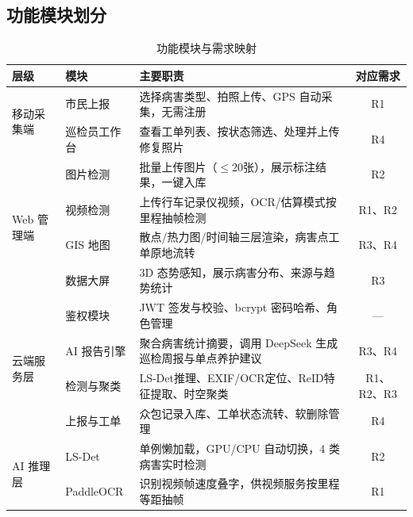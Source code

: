 \documentclass[UTF8, a4paper, fontset=ubuntu]{ctexart}
\begin{document}
  \subsection{功能模块划分}

  \begin{table}[H]
  \centering
  \caption{功能模块与需求映射}
  \label{tab:modules}
  \begin{tabular}{lllc}
  \toprule
  层级 & 模块 & 主要职责 & 对应需求 \\
  \midrule
  \multirow{2}{*}{移动采集端}
    & 市民上报     & 选择病害类型、拍照上传、GPS 自动采集，无需注册   & R1 \\
    & 巡检员工作台 & 查看工单列表、按状态筛选、处理并上传修复照片     & R4 \\
  \midrule
  \multirow{4}{*}{Web 管理端}
    & 图片检测 & 批量上传图片（$\leq$20张），展示标注结果，一键入库 & R2 \\
    & 视频检测 & 上传行车记录仪视频，OCR/估算模式按里程抽帧检测   & R1、R2 \\
    & GIS 地图 & 散点/热力图/时间轴三层渲染，病害点工单原地流转   & R3、R4 \\
    & 数据大屏 & 3D 态势感知，展示病害分布、来源与趋势统计        & R3 \\
  \midrule
  \multirow{4}{*}{云端服务层}
    & 鉴权模块   & JWT 签发与校验、bcrypt 密码哈希、角色管理            & --- \\
    & AI 报告引擎 & 聚合病害统计摘要，调用 DeepSeek \cite{deepseekv3}生成巡检周报与单点养护建议 & R3、R4 \\
    & 检测与聚类 & LS-Det推理、EXIF/OCR定位、ReID特征提取、时空聚类  & R1、R2、R3 \\
    & 上报与工单 & 众包记录入库、工单状态流转、软删除管理               & R4 \\
  \midrule
  \multirow{2}{*}{AI 推理层}
    & LS-Det & 单例懒加载，GPU/CPU 自动切换，4 类病害实时检测 & R2 \\
    & PaddleOCR & 识别视频帧速度叠字，供视频服务按里程等距抽帧   & R1 \\
  \bottomrule
  \end{tabular}
  \end{table}
\end{document}
